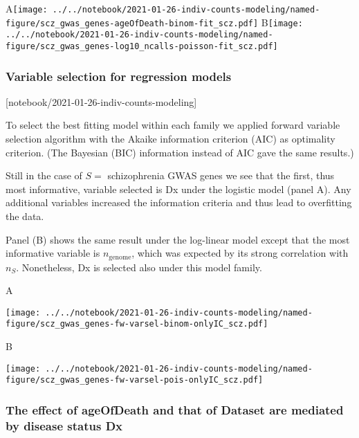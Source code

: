 \documentclass[letterpaper]{article}
\begin{document}
A\texttt{[image: ../../notebook/2021-01-26-indiv-counts-modeling/named-figure/scz\_gwas\_genes-ageOfDeath-binom-fit\_scz.pdf]}
B\texttt{[image: ../../notebook/2021-01-26-indiv-counts-modeling/named-figure/scz\_gwas\_genes-log10\_ncalls-poisson-fit\_scz.pdf]}


\subsubsection*{Variable selection for regression models}

[notebook/2021-01-26-indiv-counts-modeling]

To select the best fitting model within each family we applied forward
variable selection algorithm with the Akaike information criterion (AIC) as
optimality criterion.  (The Bayesian (BIC) information instead of AIC gave the
same results.)

Still in the case of \(S =\) schizophrenia GWAS genes we see that the first,
thus most informative, variable selected is Dx under the logistic model (panel A).
Any additional variables increased the information criteria and thus lead to
overfitting the data.

Panel (B) shows the same result under the log-linear model except that the
most informative variable is \(n_\mathrm{genome}\), which was expected by its
strong correlation with \(n_S\).  Nonetheless, Dx is selected also under this
model family.

A

\texttt{[image: ../../notebook/2021-01-26-indiv-counts-modeling/named-figure/scz\_gwas\_genes-fw-varsel-binom-onlyIC\_scz.pdf]}

B

\texttt{[image: ../../notebook/2021-01-26-indiv-counts-modeling/named-figure/scz\_gwas\_genes-fw-varsel-pois-onlyIC\_scz.pdf]}

\subsubsection*{The effect of ageOfDeath and that of Dataset are mediated by disease status Dx}
\end{document}
